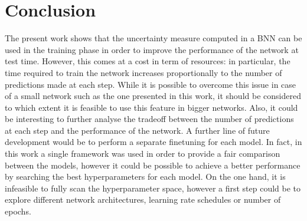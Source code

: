 \documentclass[11pt,twoside,a4paper]{article}
\begin{document}
\section{Conclusion}
The present work shows that the uncertainty measure computed in a BNN can be used in the training phase in order to improve the performance of the network at test time. However, this comes at a cost in term of resources: in particular, the time required to train the network increases proportionally to the number of predictions made at each step. While it is possible to overcome this issue in case of a small network such as the one presented in this work, it should be considered to which extent it is feasible to use this feature in bigger networks. Also, it could be interesting to further analyse the tradeoff between the number of predictions at each step and the performance of the network.\newline
A further line of future development would be to perform a separate finetuning for each model. In fact, in this work a single framework was used in order to provide a fair comparison between the models, however it could be possible to achieve a better performance by searching the best hyperparameters for each model. On the one hand, it is infeasible to fully scan the hyperparameter space, however a first step could be to explore different network architectures, learning rate schedules or number of epochs.


 
\end{document}
